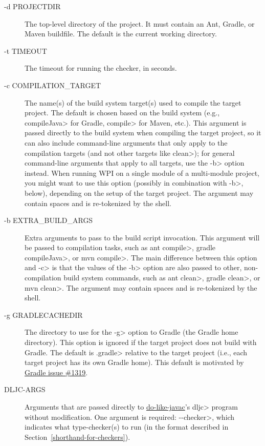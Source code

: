 \begin{description}
\item[-d PROJECTDIR]
  The top-level directory of the project.  It must contain an Ant, Gradle,
  or Maven buildfile. The default is the current working directory.

\item[-t TIMEOUT]
  The timeout for running the checker, in seconds.

\item[-c COMPILATION\_TARGET]
  The name(s) of the build system target(s) used to compile
  the target project. The default is chosen based on the build
  system (e.g., \<compileJava> for Gradle, \<compile> for Maven, etc.).
  This argument is passed directly to the build system when compiling the
  target project, so it can also include command-line arguments that only
  apply to the compilation targets (and not other targets like \<clean>);
  for general command-line arguments that apply to all targets, use the
  \<-b> option instead.
  When running WPI on a single module of a multi-module project,
  you might want to use this option (possibly in combination with \<-b>, below),
  depending on the setup of the target project.
  The argument may contain spaces and is re-tokenized by the shell.

\item[-b EXTRA\_BUILD\_ARGS]
  Extra arguments to pass to the build script invocation. This argument
  will be passed to compilation tasks, such as
  \<ant compile>, \<gradle compileJava>, or \<mvn compile>.
  The main difference between this option and \<-c> is that the values
  of the \<-b> option are also passed to other, non-compilation build system commands, such as
  \<ant clean>, \<gradle clean>, or \<mvn clean>.
  The argument may contain spaces and is re-tokenized by the shell.

\item[-g GRADLECACHEDIR]
  The directory to use for the \<-g> option to Gradle (the Gradle home
  directory). This option is ignored if the target project does not
  build with Gradle. The default is \<.gradle> relative to the target
  project (i.e., each target project has its own Gradle home). This default
  is motivated by
  \href{https://github.com/gradle/gradle/issues/1319}{Gradle issue \#1319}.

\label{DLJC-ARGS}
\item[DLJC-ARGS]
  Arguments that are passed directly to
  \href{https://github.com/kelloggm/do-like-javac}{do-like-javac}'s
  \<dljc> program without
  modification.  One argument is required: \<-\relax-checker>, which indicates
  what type-checker(s) to run (in the format described in Section~\ref{shorthand-for-checkers}).


\end{description}
